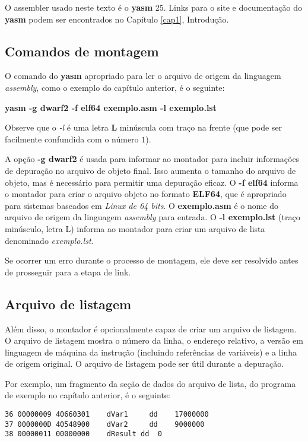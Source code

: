 O assembler usado neste texto é o \textbf{yasm} 25. Links para o site e documentação do \textbf{yasm} podem ser encontrados no Capítulo \ref{cap1}, Introdução.

\subsection{Comandos de montagem}
O comando do \textbf{yasm} apropriado para ler o arquivo de origem da linguagem \textit{assembly}, como o exemplo do capítulo anterior, é o seguinte:
\begin{center}
	\textbf{yasm -g dwarf2 -f elf64 exemplo.asm -l exemplo.lst}
\end{center}

Observe que o \textit{-l} é uma letra \textbf{L} minúscula com traço na frente (que pode ser facilmente confundida com o número $ 1$).

A opção \textbf{-g dwarf2} é usada para informar ao montador para incluir informações de depuração no arquivo de objeto final. Isso aumenta o tamanho do arquivo de objeto, mas é necessário para permitir uma depuração eficaz. O \textbf{-f elf64} informa o montador para criar o arquivo objeto no formato \textbf{ELF64}, que é apropriado para sistemas baseados em \textit{Linux de 64 bits}. O \textbf{exemplo.asm} é o nome do arquivo de origem da linguagem \textit{assembly} para entrada. O \textbf{-l exemplo.lst} (traço minúsculo, letra L) informa ao montador para criar um arquivo de lista denominado \textit{exemplo.lst}.

Se ocorrer um erro durante o processo de montagem, ele deve ser resolvido antes de prosseguir para a etapa de link.

\subsection{Arquivo de listagem}
Além disso, o montador é opcionalmente capaz de criar um arquivo de listagem. O arquivo de listagem mostra o número da linha, o endereço relativo, a versão em linguagem de máquina da instrução (incluindo referências de variáveis) e a linha de origem original. O arquivo de listagem pode ser útil durante a depuração.

Por exemplo, um fragmento da seção de dados do arquivo de lista, do programa de exemplo no capítulo anterior, é o seguinte:

\begin{verbatim}
36 00000009 40660301	dVar1	  dd	17000000
37 0000000D 40548900	dVar2	  dd	9000000
38 00000011 00000000	dResult	dd	0
\end{verbatim}

